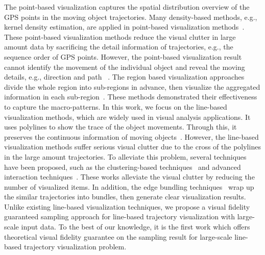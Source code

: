 The point-based visualization captures the spatial distribution overview of the GPS points in the moving object trajectories.
Many density-based methods, e.g., kernel density estimation, are applied in point-based visualization methods~\cite{liu2013vait,yang2016exploring,chae2014public,xie2008kernel, borruso2008network}.
These point-based visualization methods reduce the visual clutter in large amount data by sacrificing the detail information of trajectories, e.g., the sequence order of GPS points.
However, the point-based visualization result cannot identify the movement of the individual object and reveal the moving details, e.g.,  direction and path ~\cite{chen2015survey}.
The region based visualization approaches divide the whole region into sub-regions in advance, then visualize the aggregated information in each sub-region~\cite{guo2009flow,wood2010visualisation,von2015mobilitygraphs}.
These methods demonstrated their effectiveness to capture the macro-patterns.
In this work, we focus on the line-based visualization methods, which are widely used in visual analysis applications.
It uses polylines to show the trace of the object movements.
Through this, it preserves the continuous information of moving objects~\cite{guo2011tripvista,hurter2009fromdady}.
However, the line-based visualization methods suffer serious visual clutter due to the cross of the polylines in the large amount trajectories.
To alleviate this problem, several techniques have been proposed, such as the clustering-based techniques~\cite{ferreira2013vector, rinzivillo2008visually, von2015mobilitygraphs} and advanced interaction techniques~\cite{kruger2013trajectorylenses, ferreira2013visual}.
These works alleviate the visual clutter by reducing the number of visualized items.
In addition, the edge bundling techniques~\cite{zeng2019route,thony2015vector} wrap up the similar trajectories into bundles, then generate clear visualization results.
Unlike existing line-based visualization techniques, we propose a visual fidelity  guaranteed sampling approach for line-based trajectory visualization with large-scale input data.
To the best of our knowledge, it is the first work which offers theoretical visual fidelity guarantee on the sampling result for large-scale line-based trajectory visualization problem.





